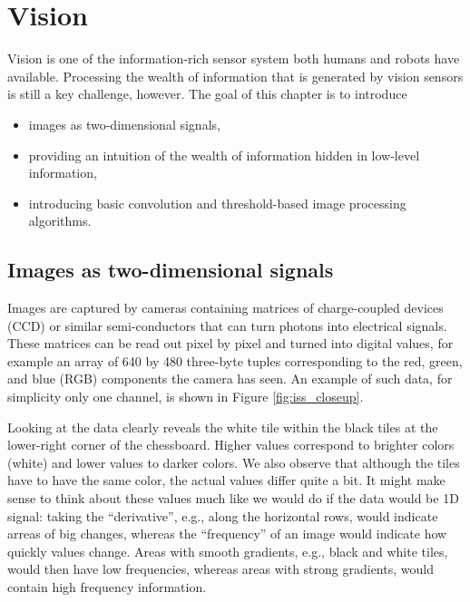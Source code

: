\chapter{Vision}\label{chap:vision}
Vision is one of the information-rich sensor system both humans and robots have available. Processing the wealth of information that is generated by vision sensors is still a key challenge, however. The goal of this chapter is to introduce
\begin{itemize}
\item images as two-dimensional signals,
\item providing an intuition of the wealth of information hidden in low-level information,
\item introducing basic convolution and threshold-based image processing algorithms.
\end{itemize}

\section{Images as two-dimensional signals}
Images are captured by cameras containing matrices of charge-coupled devices (CCD) or similar semi-conductors that can turn photons into electrical signals. These matrices can be read out pixel by pixel and turned into digital values, for example an array of 640 by 480 three-byte tuples corresponding to the red, green, and blue (RGB) components the camera has seen. An example of such data, for simplicity only one channel, is shown in Figure \ref{fig:iss_closeup}. 

Looking at the data clearly reveals the white tile within the black tiles at the lower-right corner of the chessboard. Higher values correspond to brighter colors (white) and lower values to darker colors. We also observe that although the tiles have to have the same color, the actual values differ quite a bit. It might make sense to think about these values much like we would do if the data would be 1D signal: taking the ``derivative'', e.g., along the horizontal rows, would indicate arreas of big changes, whereas the ``frequency'' of an image  would indicate how quickly values change. Areas with smooth gradients, e.g., black and white tiles, would then have low frequencies, whereas areas with strong gradients, would contain high frequency information. 

